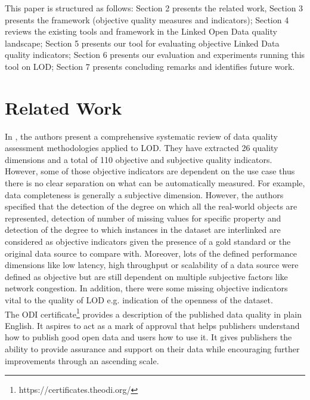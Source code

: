 \documentclass[onecolumn, crcready]{iosart2c}
\begin{document}
This paper is structured as follows: Section 2 presents the related work, Section 3 presents the framework (objective quality measures and indicators); Section 4 reviews the existing tools and framework in the Linked Open Data quality landscape; Section 5 presents our tool for evaluating objective Linked Data quality indicators; Section 6 presents our evaluation and experiments running this tool on LOD; Section 7 presents concluding remarks and identifies future work.

\section{Related Work}

In \cite{Framework2012}, the authors present a comprehensive systematic review of data quality assessment methodologies applied to LOD. They have extracted 26 quality dimensions and a total of 110 objective and subjective quality indicators. However, some of those objective indicators are dependent on the use case thus there is no clear separation on what can be automatically measured. For example, data completeness is generally a subjective dimension. However, the authors specified that the detection of the degree on which all the real-world objects are represented, detection of number of missing values for specific property and detection of the degree to which instances in the dataset are interlinked are considered as objective indicators given the presence of a gold standard or the original data source to compare with. Moreover, lots of the defined performance dimensions like low latency, high throughput or scalability of a data source were defined as objective but are still dependent on multiple subjective factors like network congestion. In addition, there were some missing objective indicators vital to the quality of LOD e.g. indication of the openness of the dataset.\\

The ODI certificate\footnote {https://certificates.theodi.org/} provides a description of the published data quality in plain English. It aspires to act as a mark of approval that helps publishers understand how to publish good open data and users how to use it. It gives publishers the ability to provide assurance and support on their data while encouraging further improvements through an ascending scale.
\end{document}
